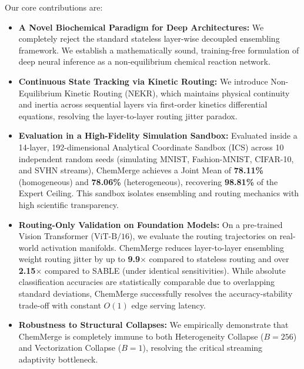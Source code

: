 Our core contributions are:
\begin{itemize}
    \item \textbf{A Novel Biochemical Paradigm for Deep Architectures:} We completely reject the standard stateless layer-wise decoupled ensembling framework. We establish a mathematically sound, training-free formulation of deep neural inference as a non-equilibrium chemical reaction network.
    \item \textbf{Continuous State Tracking via Kinetic Routing:} We introduce Non-Equilibrium Kinetic Routing (NEKR), which maintains physical continuity and inertia across sequential layers via first-order kinetics differential equations, resolving the layer-to-layer routing jitter paradox.
    \item \textbf{Evaluation in a High-Fidelity Simulation Sandbox:} Evaluated inside a 14-layer, 192-dimensional Analytical Coordinate Sandbox (ICS) across 10 independent random seeds (simulating MNIST, Fashion-MNIST, CIFAR-10, and SVHN streams), ChemMerge achieves a Joint Mean of \textbf{78.11\%} (homogeneous) and \textbf{78.06\%} (heterogeneous), recovering \textbf{98.81\%} of the Expert Ceiling. This sandbox isolates ensembling and routing mechanics with high scientific transparency.
    \item \textbf{Routing-Only Validation on Foundation Models:} On a pre-trained Vision Transformer ($\text{ViT-B/16}$), we evaluate the routing trajectories on real-world activation manifolds. ChemMerge reduces layer-to-layer ensembling weight routing jitter by up to \textbf{9.9$\times$} compared to stateless routing and over \textbf{2.15$\times$} compared to SABLE (under identical sensitivities). While absolute classification accuracies are statistically comparable due to overlapping standard deviations, ChemMerge successfully resolves the accuracy-stability trade-off with constant $O(1)$ edge serving latency.
    \item \textbf{Robustness to Structural Collapses:} We empirically demonstrate that ChemMerge is completely immune to both Heterogeneity Collapse ($B=256$) and Vectorization Collapse ($B=1$), resolving the critical streaming adaptivity bottleneck.
\end{itemize}
